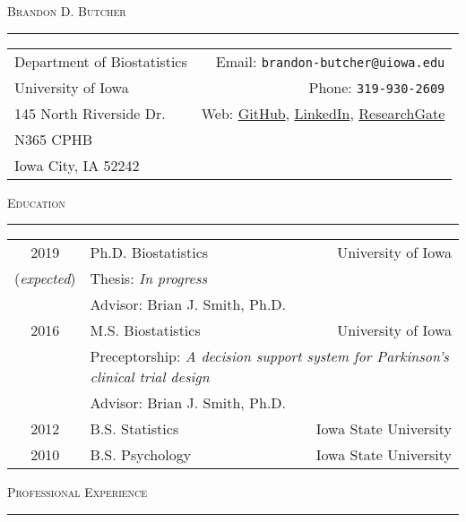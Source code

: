\documentclass[a4paper]{article}
\newcommand{\LinkedIn}{\href{https://www.linkedin.com/in/brandon-butcher-72250153/}{LinkedIn}}
\newcommand{\ResearchGate}{\href{https://www.researchgate.net/profile/Brandon_Butcher}{ResearchGate}}
\newcommand{\GitHub}{\href{https://github.com/brandondbutcher}{GitHub}}
\begin{document}
\begin{center}
  \Huge\textsc{Brandon D. Butcher}
  \textcolor{usafagrey}{\rule{\textwidth}{1pt}}
\end{center}


\begin{tabular*}{0.95\textwidth}{@{\extracolsep{\fill}}lr}
  Department of Biostatistics & Email: \texttt{brandon-butcher@uiowa.edu} \\
  University of Iowa & Phone: \texttt{319-930-2609} \\
  145 North Riverside Dr.  & Web: \GitHub, \LinkedIn, \ResearchGate \\
  N365 CPHB & \\
  Iowa City, IA 52242 &  \\
\end{tabular*}
\vspace{\baselineskip}


\begin{flushleft}
  \Large\textsc{Education}
  \textcolor{usafagrey}{\rule[0.5\baselineskip]{\textwidth}{0.75pt}}
\end{flushleft}
\vspace{-\baselineskip}

\begin{tabular*}{0.96\textwidth}{@{\extracolsep{\fill}}clr}
  2019 & Ph.D. Biostatistics & University of Iowa \\
  (\textit{expected}) & Thesis: \textit{In progress} & \\
   & Advisor: Brian J. Smith, Ph.D. & \\[3pt]
  2016 & M.S. Biostatistics & University of Iowa \\
   & \multicolumn{2}{l}{
    Preceptorship: \textit{
      A decision support system for Parkinson's clinical trial design
   }} \\
   & Advisor: Brian J. Smith, Ph.D. & \\[3pt]
  2012 & B.S. Statistics & Iowa State University \\
  2010 & B.S. Psychology & Iowa State University
\end{tabular*}
\vspace{0.25\baselineskip}


\begin{flushleft}
  \Large\textsc{Professional Experience}
  \textcolor{usafagrey}{\rule[0.5\baselineskip]{\textwidth}{0.75pt}}
\end{flushleft}
\vspace{-\baselineskip}
\end{document}
